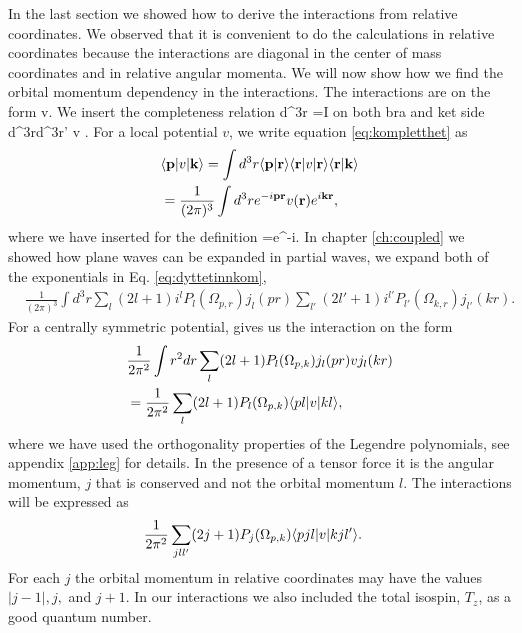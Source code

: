 In the last section we showed how to derive the interactions from relative coordinates. We observed that it is convenient to do the calculations in relative coordinates because the interactions are diagonal in the center of mass coordinates and in relative angular momenta. We will now show how we find the orbital momentum dependency in the interactions. 
The interactions are on the form
\beq
		v\notag.		
\eeq
We insert the completeness relation 
\beq
\int d^3r =I
\eeq
on both bra and ket side
\be
\int d^3r\int d^3r' v .
\label{eq:kompletthet}
\ee
For a local potential $v$, we write equation \eqref{eq:kompletthet} as
\begin{align}
	&	\bra{\bold p}v\ket{\bold k}=\int d^3r \braket{\bold p}{\bold r}\bra{\bold r}v\ket{\bold r}\braket{\bold r}{\bold k}\notag\\
	&=\frac{1}{(2\pi)^3}\int d^3re^{-i\bold p \bold r}v(\bold r)e^{i\bold{kr}},
	\label{eq:dyttetinnkom}
\end{align}
where we have inserted for the definition
\beq
{}=e^{-i}.
\eeq
In chapter \ref{ch:coupled} we showed how plane waves can be expanded in partial waves, we expand  both of the exponentials
in Eq. \eqref{eq:dyttetinnkom},
\begin{align}
		&\frac{1}{(2\pi)^3}\int d^3r \sum_l (2 l + 1 ) i^l P_l(\Omega_{p,r}) j_l(pr) \sum_{l'} (2 l' + 1 ) i^{l'} P_{l'}(\Omega_{k,r}) j_{l'}(kr).
		\label{eq:soonpotential}
\end{align}
For a centrally symmetric potential, gives us the interaction on the form
\begin{align}
	&	\frac{1}{2\pi^2}\int r^2dr\sum_l (2 l +  1 ) P_l(\Omega_{p,k}) j_l(pr)vj_l(kr)\notag \\
		&=\frac{1}{2\pi^2}\sum_l (2 l +  1 ) P_l(\Omega_{p,k})\bra{pl}v\ket{kl}, 
		\label{eq:vrl}
\end{align}
where we have used the orthogonality properties of the Legendre polynomials, see appendix \ref{app:leg} for details.
In the presence of a tensor force it is the angular momentum, $j$ that is conserved and not the orbital momentum 
$l$. The interactions will be expressed as
\begin{align}
		&\frac{1}{2\pi^2}\sum_{jll'} (2 j +  1 ) P_j(\Omega_{p,k})\bra{pjl}v\ket{kjl'}.
			\label{eq:vrlj}
\end{align}
For each $j$ the orbital momentum in relative coordinates may have the values $|j-1|,j,$ and $j+1$. 
In our interactions we also included the total isospin, $T_z$, as a good quantum number.
